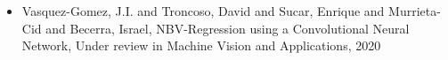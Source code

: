 \begin{itemize} 
\item Vasquez-Gomez, J.I. and Troncoso, David and Sucar, Enrique and Murrieta-Cid and Becerra, Israel, NBV-Regression using a Convolutional Neural Network, Under review in Machine Vision and Applications, 2020 
\end{itemize} 
